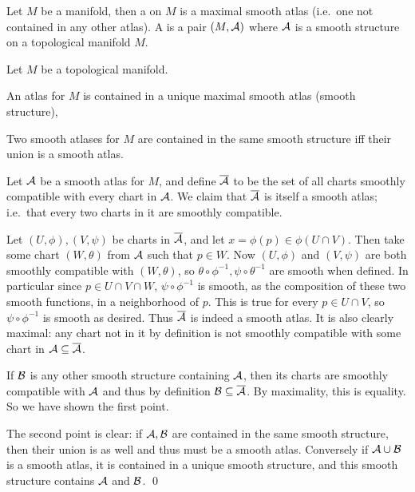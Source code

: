 \bdefn

    Let $M$ be a manifold, then a  on $M$ is a maximal smooth atlas (i.e.\ one not contained in any other atlas).
    A  is a pair $(M,{{\cal A}})$ where ${{\cal A}}$ is a smooth structure on a topological manifold $M$.

\edefn

\bprop

    Let $M$ be a topological manifold.
    \benum
        \item An atlas for $M$ is contained in a unique maximal smooth atlas (smooth structure),
        \item Two smooth atlases for $M$ are contained in the same smooth structure iff their union is a smooth atlas.
    \eenum

\eprop

\bproof

    Let ${{\cal A}}$ be a smooth atlas for $M$, and define $\overline{{{\cal A}}}$ to be the set of all charts smoothly compatible with every chart in ${{\cal A}}$.
    We claim that $\overline{{{\cal A}}}$ is itself a smooth atlas; i.e.\ that every two charts in it are smoothly compatible.

    Let $(U,\phi),(V,\psi)$ be charts in $\overline{{{\cal A}}}$, and let $x=\phi(p)\in\phi(U\cap V)$.
    Then take some chart $(W,\theta)$ from ${{\cal A}}$ such that $p\in W$.
    Now $(U,\phi)$ and $(V,\psi)$ are both smoothly compatible with $(W,\theta)$, so $\theta\circ\phi^{-1},\psi\circ\theta^{-1}$ are smooth when defined.
    In particular since $p\in U\cap V\cap W$, $\psi\circ\phi^{-1}$ is smooth, as the composition of these two smooth functions, in a neighborhood of $p$.
    This is true for every $p\in U\cap V$, so $\psi\circ\phi^{-1}$ is smooth as desired.
    Thus $\overline{{{\cal A}}}$ is indeed a smooth atlas.
    It is also clearly maximal: any chart not in it by definition is not smoothly compatible with some chart in ${{\cal A}}\subseteq\overline{{{\cal A}}}$.

    If ${{\cal B}}$ is any other smooth structure containing ${{\cal A}}$, then its charts are smoothly compatible with ${{\cal A}}$ and thus by definition ${{\cal B}}\subseteq\overline{{{\cal A}}}$.
    By maximality, this is equality.
    So we have shown the first point.

    The second point is clear: if ${{\cal A}},{{\cal B}}$ are contained in the same smooth structure, then their union is as well and thus must be a smooth atlas.
    Conversely if ${{\cal A}}\cup{{\cal B}}$ is a smooth atlas, it is contained in a unique smooth structure, and this smooth structure contains ${{\cal A}}$ and ${{\cal B}}$.
    \qed

